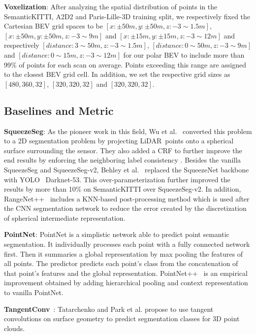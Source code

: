 \documentclass[10pt,twocolumn,letterpaper]{article}
\newcommand{\lidar}{\mbox{LiDAR }}
\begin{document}
\textbf{Voxelization}: After analyzing the spatial distribution of points in the SemanticKITTI, A2D2 and Paris-Lille-3D training split, we respectively fixed the Cartesian BEV grid spaces to be $[x: \pm 50m, y: \pm 50m, z:-3 \sim 1.5m]$, $[x: \pm 50m, y: \pm 50m, z:-3 \sim 9m]$ and $[x: \pm 15m, y: \pm 15m, z:-3 \sim 12m]$ and respectively $[distance: 3 \sim 50m, z:-3 \sim 1.5m]$, $[distance: 0 \sim 50m, z:-3 \sim 9m]$ and $[distance: 0 \sim 15m, z:-3 \sim 12m]$ for our polar BEV to include more than 99\% of points for each scan on average. Points exceeding this range are assigned to the closest BEV grid cell. In addition, we set the respective grid sizes as $[480,360,32]$, $[320,320,32]$ and $[320,320,32]$.

\subsection{Baselines and Metric}

\textbf{SqueezeSeg}: As the pioneer work in this field, Wu et al.~\cite{wu2018squeezeseg} converted this problem to a 2D segmentation problem by projecting \lidar points onto a spherical surface surrounding the sensor. They also added a CRF to further improve the end results by enforcing the neighboring label consistency . Besides the vanilla SqueezeSeg and SqueezeSeg-v2, Behley et al.~\cite{behley2019iccv} replaced the SqueezeNet backbone with YOLO~\cite{redmon2018yolov3} Darknet-53. This over-parameterization further improved the results by more than 10\% on SemanticKITTI over SqueezeSeg-v2. In addition, RangeNet++~\cite{milioto2019rangenet++} includes a KNN-based post-processing method which is used after the CNN segmentation network to reduce the error created by the discretization of spherical intermediate representation.

\textbf{PointNet}\cite{qi2017pointnet}: PointNet is a simplistic network able to predict point semantic segmentation. It individually processes each point with a fully connected network first. Then it summaries a global representation by max pooling the features of all points. The predictor predicts each point’s class from the concatenation of that point’s features and the global representation. PointNet++~\cite{qi2017pointnet++} is an empirical improvement obtained by adding hierarchical pooling and context representation to vanilla PointNet.

\textbf{TangentConv}~\cite{Tatarchenko_2018_CVPR}: Tatarchenko and Park et al. propose to use tangent convolutions on surface geometry to predict segmentation classes for 3D point clouds.
\end{document}
